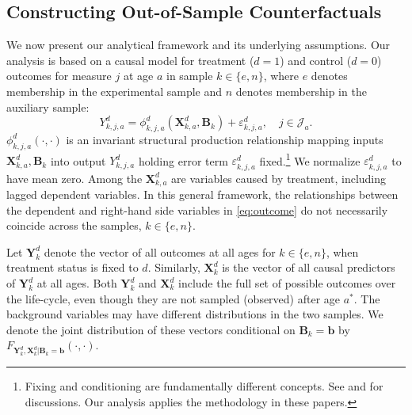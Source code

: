 \begin{figure}
\end{figure}

\subsection{Constructing Out-of-Sample Counterfactuals}\label{section:just}

We now present our analytical framework and its underlying assumptions. Our analysis is based on a causal model for treatment ($d=1$) and control ($d=0$) outcomes for measure $j$ at age $a$ in sample $k \in \{e,n\}$, where $e$ denotes membership in the experimental sample and $n$ denotes membership in the auxiliary sample:
\begin{equation}\label{eq:outcome}
Y^d_{k,j,a} = \phi^d_{k,j,a} (\bm{X}^d_{k,a}, \bm{B}_k) + \varepsilon^d_{k,j,a}, \quad j \in \mathcal{J}_a.
\end{equation}
$\phi^d_{k,j,a}\left( \cdot, \cdot \right)$ is an invariant structural production relationship mapping inputs $\bm{X}^d_{k,a}, \bm{B}_k$ into output $Y^d_{k,j,a}$ holding error term $\varepsilon^d_{k,j,a}$ fixed.\footnote{Fixing and conditioning are fundamentally different concepts. See \cite{Haavelmo_1943_Econometrica} and \citet{Heckman_Pinto_2015_EconometTheory} for discussions. Our analysis applies the methodology in these papers.} We normalize $\varepsilon^d_{k,j,a}$ to have mean zero. Among the $\bm{X}^d_{k,a}$ are variables caused by treatment, including lagged dependent variables. In this general framework, the relationships between the dependent and right-hand side variables in \eqref{eq:outcome} do not necessarily coincide across the samples, $k \in \{e,n\}$.

Let $\bm{Y}_k^d$ denote the vector of all outcomes at all ages for $k \in \{e, n \}$, when treatment status is fixed to $d$. Similarly, $\bm{X}_k^d$ is the vector of all causal predictors of $\bm{Y}_k^d$ at all ages. Both $\bm{Y}_k^d$ and $\bm{X}_k^d$ include the full set of possible outcomes over the life-cycle, even though they are not sampled (observed) after age $a^*$. The background variables may have different distributions in the two samples. We denote the joint distribution of these vectors conditional on $\bm{B}_k = \bm{b}$ by $F_{\bm{Y}_k^d, \bm{X}_k^d | \bm{B}_k = \bm{b}}(\cdot,\cdot)$.

